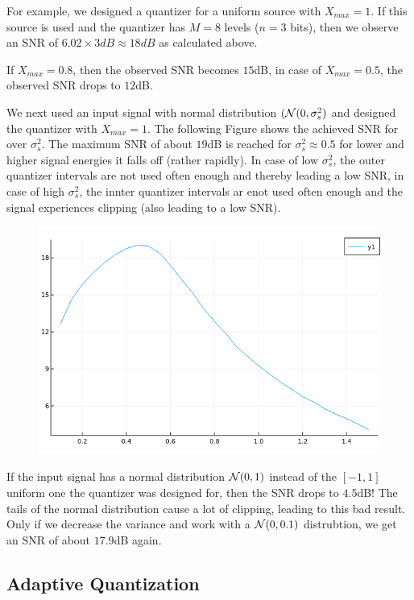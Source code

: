 For example, we designed a quantizer for a uniform source with $X_{max} = 1$. If this source is used and the quantizer has $M = 8$ levels ($n = 3$ bits), then we observe an SNR of $6.02 \times 3 dB \approx 18dB$ as calculated above.

If $X_{max} = 0.8$, then the observed SNR becomes $15$dB, in case of $X_{max} = 0.5$, the observed SNR drops to  $12$dB.

We next used an input signal with normal distribution $(\mathcal{N}(0, \sigma_s^2)$ and designed the quantizer with $X_{max} = 1$. The following Figure shows the achieved SNR for over $\sigma_s^2$. The maximum SNR of about $19$dB is reached for $\sigma_s^2 \approx 0.5$ for lower and higher signal energies it falls off (rather rapidly). In case of low $\sigma_s^2$, the outer quantizer intervals are not used often enough and thereby leading a low SNR, in case of high $\sigma_s^2$, the innter quantizer intervals ar enot used often enough and the signal experiences clipping (also leading to a low SNR).

\begin{figure}[H]
    \centering
    \includegraphics[scale=0.5]{images/2021-06-15-scalar_quant_03.png}
\end{figure}



If the input signal has a normal distribution $\mathcal{N}(0,1)$ instead of the $[-1, 1]$ uniform one the quantizer was designed for, then the SNR drops to $4.5$dB! The tails of the normal distribution cause a lot of clipping, leading to this bad result. Only if we decrease the variance and work with a $\mathcal{N}(0, 0.1)$ distrubtion, we get an SNR of about $17.9$dB again.

\subsection{Adaptive Quantization}

